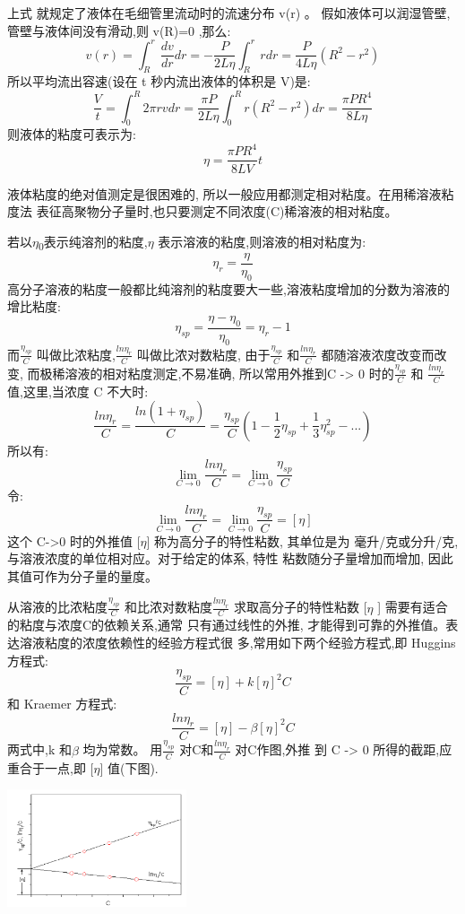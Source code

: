 \documentclass[11pt]{report}
\begin{document}
上式 就规定了液体在毛细管里流动时的流速分布 v(r) 。
假如液体可以润湿管壁,管壁与液体间没有滑动,则
v(R)=0 ,那么:
\[
v(r)=\int^{r}_{R} \frac{d v}{d r}d r=-\frac{P}{2L\eta}\int^{r}_{R}r dr=\frac{P}{4L\eta}\left(R^{2}-r^{2}\right)
\]
所以平均流出容速(设在 t 秒内流出液体的体积是 V)是:
\[
\frac{V}{t}=\int^{R}_{0}2\pi rvdr=\frac{\pi P}{2L\eta}\int^{R}_{0}r\left(R^{2}-r^{2}\right)dr=\frac{\pi PR^{4}}{8L\eta}
\]
则液体的粘度可表示为:
\[
\eta=\frac{\pi P R^{4}}{8LV}t
\]

液体粘度的绝对值测定是很困难的, 所以一般应用都测定相对粘度。在用稀溶液粘度法
表征高聚物分子量时,也只要测定不同浓度(C)稀溶液的相对粘度。

若以\(\eta\)\textsubscript{0}表示纯溶剂的粘度,\(\eta\) 表示溶液的粘度,则溶液的相对粘度为:
\[
\eta_{r}=\frac{\eta}{\eta_{0}}
\]
高分子溶液的粘度一般都比纯溶剂的粘度要大一些,溶液粘度增加的分数为溶液的增比粘度:
\[
\eta_{sp}=\frac{\eta -\eta_{0}}{\eta_{0}}=\eta_{r}-1
\]
而\(\frac{\eta_{sp}}{C}\) 叫做比浓粘度,\(\frac{ln\eta_{r}}{C}\) 叫做比浓对数粘度,
由于\(\frac{\eta_{sp}}{C}\) 和\(\frac{ln\eta_{r}}{C}\) 都随溶液浓度改变而改变,
而极稀溶液的相对粘度测定,不易准确, 所以常用外推到C -> 0 时的\(\frac{\eta_{sp}}{C}\) 和
\(\frac{ln\eta_{r}}{C}\) 值,这里,当浓度 C 不大时:
\[
\frac{ln\eta_{r}}{C}=\frac{ln\left(1+\eta_{sp}\right)}{C}=\frac{\eta_{sp}}{C}\left(1-\frac{1}{2}\eta_{sp}+\frac{1}{3}\eta_{sp}^{2}-...\right)
\]
所以有:
\[
\lim_{C\to 0}\frac{ln\eta_{r}}{C}=\lim_{C\to 0}\frac{\eta_{sp}}{C}
\]
令:
\[
\lim_{C\to 0}\frac{ln\eta_{r}}{C}=\lim_{C\to 0}\frac{\eta_{sp}}{C}=[\eta]
\]
这个 C->0 时的外推值 [\(\eta\)] 称为高分子的特性粘数, 其单位是为
毫升/克或分升/克,与溶液浓度的单位相对应。对于给定的体系, 特性
粘数随分子量增加而增加, 因此其值可作为分子量的量度。

从溶液的比浓粘度\(\frac{\eta_{sp}}{C}\) 和比浓对数粘度\(\frac{ln\eta_{r}}{C}\) 求取高分子的特性粘数 [\(\eta\) ]
需要有适合的粘度与浓度C的依赖关系,通常
只有通过线性的外推, 才能得到可靠的外推值。表达溶液粘度的浓度依赖性的经验方程式很
多,常用如下两个经验方程式,即 Huggins 方程式:
\[
\frac{\eta_{sp}}{C}=[\eta]+k[\eta]^{2}C
\]
和 Kraemer 方程式:
\[
\frac{ln\eta_{r}}{C}=[\eta]-\beta [\eta]^{2}C
\]
两式中,k 和\(\beta\) 均为常数。
用\(\frac{\eta_{sp}}{C}\) 对C和\(\frac{ln\eta_{r}}{C}\) 对C作图,外推
到 C -> 0 所得的截距,应重合于一点,即 [\(\eta\)] 值(下图).
\begin{center}
\includegraphics[width=200]{../img/3.png}
\end{center}
\end{document}
